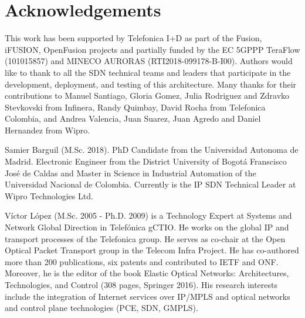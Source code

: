 \documentclass[10pt, conference]{IEEEtran}
\begin{document}

\section*{Acknowledgements}
This  work has been supported by Telefonica I+D as part of the Fusion, i\uppercase{FUSION}, OpenFusion projects and partially funded by the EC 5GPPP TeraFlow (101015857) and MINECO AURORAS (RTI2018-099178-B-I00). Authors would like to thank to all the SDN technical teams and leaders that participate in the development, deployment, and testing of this  architecture. Many thanks for their contributions to Manuel Santiago, Gloria Gomez, Julia Rodriguez and Zdravko Stevkovski from Infinera, Randy Quimbay, David Rocha from Telefonica Colombia, and Andrea Valencia, Juan Suarez, Juan Agredo and Daniel Hernandez from Wipro.   

%



\begin{IEEEbiography}
%
{Samier Barguil} (M.Sc. 2018). PhD Candidate from the Universidad Autonoma de Madrid. Electronic Engineer from the District University of Bogot\'a Franscisco José de Caldas and Master in Science in Industrial Automation of the Universidad Nacional de Colombia. Currently is the IP SDN Technical Leader at Wipro Technologies Ltd.\end{IEEEbiography}

\begin{IEEEbiography}%
{Víctor López} (M.Sc. 2005 - Ph.D. 2009) is a Technology Expert at Systems and Network Global Direction in Telefónica gCTIO. He works on the global IP and transport processes of the Telefonica group. He serves as co-chair at the Open Optical Packet Transport group in the Telecom Infra Project. He has co-authored more than 200 publications, six patents and contributed to IETF and ONF. Moreover, he is the editor of the book Elastic Optical Networks: Architectures, Technologies, and Control (308 pages, Springer 2016). His research interests include the integration of Internet services over IP/MPLS and optical networks and control plane technologies (PCE, SDN, GMPLS).\end{IEEEbiography}
\end{document}
